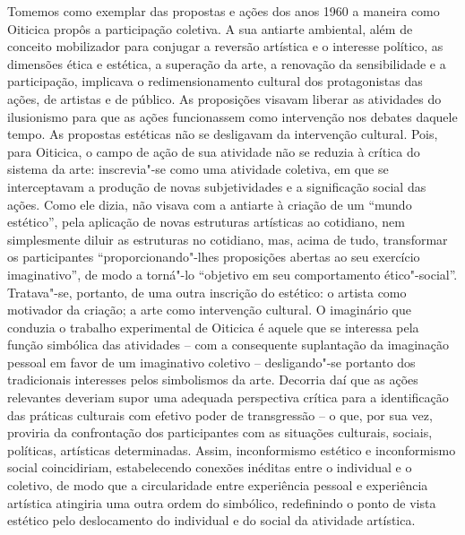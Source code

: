 Tomemos como exemplar das propostas e ações dos anos 1960 a maneira como
Oiticica propôs a participação coletiva. A sua antiarte ambiental, além
de conceito mobilizador para conjugar a reversão artística e o interesse
político, as dimensões ética e estética, a superação da arte, a
renovação da sensibilidade e a participação, implicava o
redimensionamento cultural dos protagonistas das ações, de artistas e de
público. As proposições visavam liberar as atividades do ilusionismo
para que as ações funcionassem como intervenção nos debates daquele
tempo. As propostas estéticas não se desligavam da intervenção cultural.
Pois, para Oiticica, o campo de ação de sua atividade não se reduzia à
crítica do sistema da arte: inscrevia"-se como uma atividade coletiva, em
que se interceptavam a produção de novas subjetividades e a significação
social das ações. Como ele dizia, não visava com a antiarte à criação de
um ``mundo estético'', pela aplicação de novas estruturas artísticas ao
cotidiano, nem simplesmente diluir as estruturas no cotidiano, mas,
acima de tudo, transformar os participantes ``proporcionando"-lhes
proposições abertas ao seu exercício imaginativo'', de modo a torná"-lo
``objetivo em seu comportamento ético"-social''. Tratava"-se, portanto, de
uma outra inscrição do estético: o artista como motivador da criação; a
arte como intervenção cultural. O imaginário que conduzia o trabalho
experimental de Oiticica é aquele que se interessa pela função simbólica
das atividades -- com a consequente suplantação da imaginação pessoal em
favor de um imaginativo coletivo -- desligando"-se portanto dos
tradicionais interesses pelos simbolismos da arte. Decorria daí que as
ações relevantes deveriam supor uma adequada perspectiva crítica para a
identificação das práticas culturais com efetivo poder de transgressão
-- o que, por sua vez, proviria da confrontação dos participantes com as
situações culturais, sociais, políticas, artísticas determinadas. Assim,
inconformismo estético e inconformismo social coincidiriam,
estabelecendo conexões inéditas entre o individual e o coletivo, de modo
que a circularidade entre experiência pessoal e experiência artística
atingiria uma outra ordem do simbólico, redefinindo o ponto de vista
estético pelo deslocamento do individual e do social da atividade
artística.

